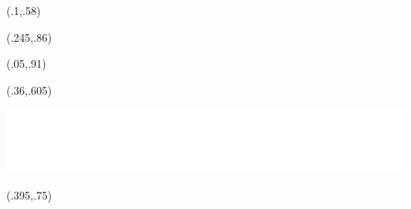 \begin{textblock}{.6}(.1,.58)
\end{textblock}


\begin{textblock}{.3}(.245,.86)
\end{textblock}

\begin{textblock}{.4}(.05,.91)
\end{textblock}

\begin{textblock}{.6}(.36,.605)
	\begin{center}
		\includegraphics[width=.575\paperwidth]{images/copertina1}
	\end{center}
\end{textblock}


\begin{textblock}{.3}(.395,.75)
\end{textblock}



